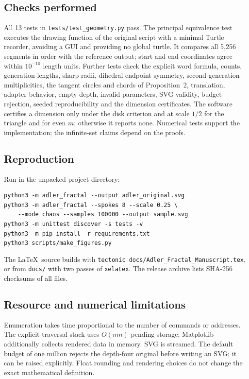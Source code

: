 \documentclass[11pt,a4paper]{article}
\begin{document}
\subsection*{Checks performed}
All 13 tests in \texttt{tests/test\_geometry.py} pass. The principal
equivalence test executes the drawing function of the original script with
a minimal Turtle recorder, avoiding a GUI and providing no global turtle.
It compares all 5,256 segments in order with the reference output; start
and end coordinates agree within $10^{-10}$ length units. Further tests
check the explicit word formula, counts, generation lengths, sharp radii,
dihedral endpoint symmetry, second-generation multiplicities, the tangent
circles and chords of Proposition~2, translation,
adapter behavior, empty depth, invalid parameters, SVG validity, budget
rejection, seeded reproducibility and the dimension certificates. The
software certifies a dimension only under the disk criterion and at scale
$1/2$ for the triangle and for even $m$; otherwise it reports none.
Numerical tests support the implementation; the infinite-set claims depend
on the proofs.

\subsection*{Reproduction}
Run in the unpacked project directory:
\begin{verbatim}
python3 -m adler_fractal --output adler_original.svg
python3 -m adler_fractal --spokes 8 --scale 0.25 \
    --mode chaos --samples 100000 --output sample.svg
python3 -m unittest discover -s tests -v
python3 -m pip install -r requirements.txt
python3 scripts/make_figures.py
\end{verbatim}
The \LaTeX\ source builds with
\texttt{tectonic docs/Adler\_Fractal\_Manuscript.tex}, or from \texttt{docs/}
with two passes of \texttt{xelatex}. The release archive lists SHA-256
checksums of all files.

\subsection*{Resource and numerical limitations}
Enumeration takes time proportional to the number of commands or
addresses. The explicit traversal stack uses $O(mn)$ pending storage;
Matplotlib additionally collects rendered data in memory. SVG is streamed.
The default budget of one million rejects the depth-four original before
writing an SVG; it can be raised explicitly. Float rounding and rendering
choices do not change the exact mathematical definition.
\end{document}
